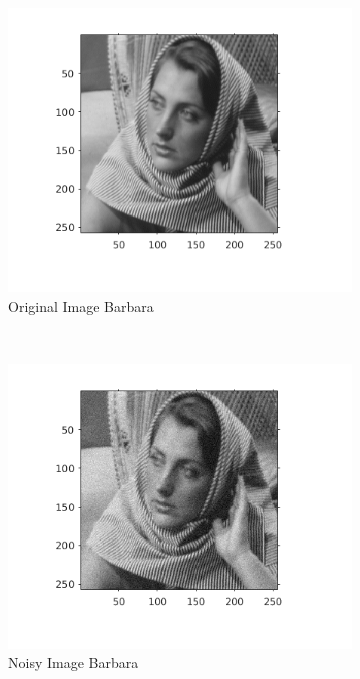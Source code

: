 \documentclass{article}
\begin{document}
\begin{figure}[h!]
  \begin{subfigure}[t]{0.32\textwidth}
    \centering
    \includegraphics[scale=0.5]{images/original_image_barbara}
    \caption{Original Image Barbara}
    \label{Fig :1a}
  \end{subfigure}
  ~
  \begin{subfigure}[t]{0.32\textwidth}
    \centering
    \includegraphics[scale=0.5]{images/noisy_image_barbara}
    \caption{Noisy Image Barbara}
    \label{Fig :1b}
  \end{subfigure}
  ~
  \begin{subfigure}[t]{0.32\textwidth}
    \centering

\end{subfigure}
\end{figure}
\end{document}
